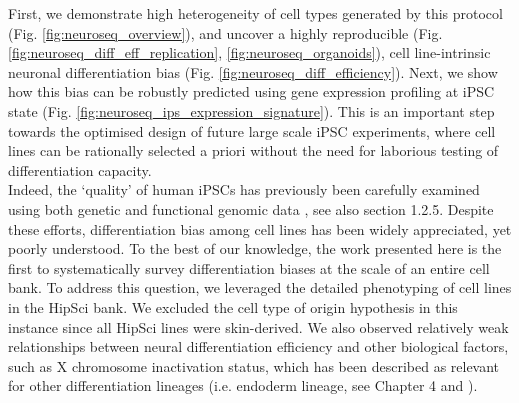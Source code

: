First, we demonstrate high heterogeneity of cell types generated by this protocol (Fig. \ref{fig:neuroseq_overview}), and uncover a highly reproducible (Fig. \ref{fig:neuroseq_diff_eff_replication}, \ref{fig:neuroseq_organoids}), cell line-intrinsic neuronal differentiation bias (Fig. \ref{fig:neuroseq_diff_efficiency}).
Next, we show how this bias can be robustly predicted using gene expression profiling at iPSC state (Fig. \ref{fig:neuroseq_ips_expression_signature}). 
This is an important step towards the optimised design of future large scale iPSC experiments, where cell lines can be rationally selected a priori without the need for laborious testing of differentiation capacity. \\

Indeed, the `quality' of human iPSCs has previously been carefully examined using both genetic and functional genomic data \cite{muller2011bioinformatic, international2018assessment, tsankov2015qpcr, bock2011reference}, see also section
1.2.5. 
Despite these efforts, differentiation bias among cell lines has been widely appreciated, yet poorly understood. 
To the best of our knowledge, the work presented here is the first to systematically survey differentiation biases at the scale of an entire cell bank. 
To address this question, we leveraged the detailed phenotyping of cell lines in the HipSci bank.
We excluded the cell type of origin hypothesis \cite{hu2016effects} in this instance since all HipSci lines were skin-derived.
We also observed relatively weak relationships between neural differentiation efficiency and other biological factors, such as X chromosome inactivation status, which has been described as relevant for other differentiation lineages (i.e. endoderm lineage, see Chapter
4 and \cite{cuomo2020single}).
\\

